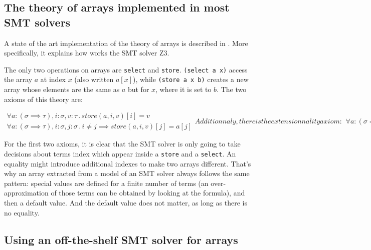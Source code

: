 \documentclass[]{article}
\begin{document}
\subsection{The theory of arrays implemented in most SMT
solvers}\label{the-theory-of-arrays-implemented-in-most-smt-solvers}

A state of the art implementation of the theory of arrays is described
in \cite{de2009generalized}. More specifically, it
explains how works the SMT solver Z3.

The only two operations on arrays are \texttt{select} and
\texttt{store}. \texttt{(select\ a\ x)} access the array $a$ at index
$x$ (also written $a[x]$), while \texttt{(store\ a\ x\ b)} creates a
new array whose elements are the same as $a$ but for $x$, where it
is set to $b$. The two axioms of this theory are:

\begin{subequations}
    \begin{align}
        \forall a:(\sigma \implies \tau), i:\sigma, v:\tau\, .\, store(a, i, v)[i] = v
        \\
        \forall a:(\sigma \implies \tau), i:\sigma, j:\sigma\, .\, i \neq j \implies store(a, i, v)[j] = a[j]
    \end{align}


    Additionnaly, there is the extensionnality axiom:

    \begin{align}
        \forall a:(\sigma \implies \tau), b:(\sigma \implies \tau)\, .\, a \neq b \iff \exists i\: a[i] \implies a[i] \neq b[i]
    \end{align}
\end{subequations}

For the first two axioms, it is clear that the SMT solver is only going
to take decisions about terms index which appear inside a \texttt{store}
and a \texttt{select}. An equality might introduce additional indexes to
make two arrays different. That's why an array extracted from a model of
an SMT solver always follows the same pattern: special values are
defined for a finite number of terms (an over-approximation of those
terms can be obtained by looking at the formula), and then a default
value. And the default value does not matter, as long as there is no
equality.

\subsection{Using an off-the-shelf SMT solver for
arrays}\label{using-an-off-the-shelf-smt-solver-for-arrays}
\end{document}
